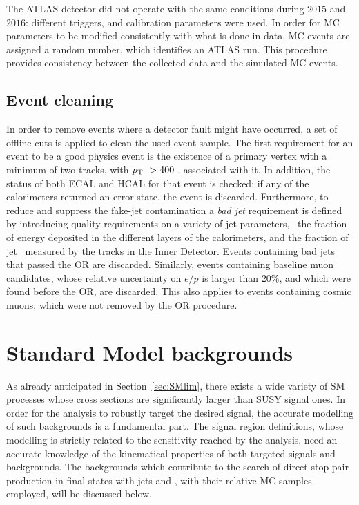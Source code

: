 		The \ac{ATLAS} detector did not operate with the same conditions during $2015$ and $2016$: different triggers, and calibration parameters were used. In order for \ac{MC} parameters to be modified consistently with what is done in data, \ac{MC} events are assigned a random number, which identifies an ATLAS run. This procedure provides consistency between the collected data and the simulated \ac{MC} events. %

		\subsection{Event cleaning}

			In order to remove events where a detector fault might have occurred, a set of offline cuts is applied to clean the used event sample. The first requirement for an event to be a good physics event is the existence of a primary vertex with a minimum of two tracks, with $p_{\mathrm{T}}\ > 400$ \MeV, associated with it. In addition, the status of both \ac{ECAL} and \ac{HCAL} for that event is checked: if any of the calorimeters returned an error state, the event is discarded. Furthermore, to reduce and suppress the fake-jet contamination a \emph{bad jet} requirement is defined by introducing quality requirements on a variety of jet parameters, \eg\ the fraction of energy deposited in the different layers of the calorimeters, and the fraction of jet \pt\ measured by the tracks in the Inner Detector. Events containing bad jets that passed the \ac{OR} are discarded. Similarly, events containing baseline muon candidates, whose relative uncertainty on $e/p$ is larger than $20\%$, and which were found before the \ac{OR}, are discarded. This also applies to events containing cosmic muons, which were not removed by the \ac{OR} procedure.				


	\section{Standard Model backgrounds}
	\label{sec:SMbkg}

		As already anticipated in Section~\ref{sec:SMlim}, there exists a wide variety of \ac{SM} processes whose cross sections are significantly larger than \ac{SUSY} signal ones. In order for the analysis to robustly target the desired signal, the accurate modelling of such backgrounds is a fundamental part. The signal region definitions, whose modelling is strictly related to the sensitivity reached by the analysis, need an accurate knowledge of the kinematical properties of both targeted signals and backgrounds. The backgrounds which contribute to the search of direct stop-pair production in final states with jets and \met, with their relative \ac{MC} samples employed, will be discussed below.

